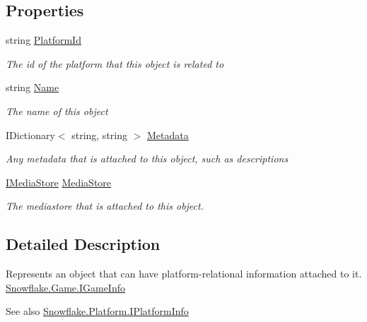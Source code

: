 \subsection*{Properties}
\begin{DoxyCompactItemize}
\item 
string \hyperlink{interface_snowflake_1_1_information_1_1_i_info_adbca5b9f2db24b233866de3304500088}{Platform\+Id}
\begin{DoxyCompactList}\small\item\em The id of the platform that this object is related to \end{DoxyCompactList}\item 
string \hyperlink{interface_snowflake_1_1_information_1_1_i_info_ad9450963e1d3443d2e5df274638fd8be}{Name}
\begin{DoxyCompactList}\small\item\em The name of this object \end{DoxyCompactList}\item 
I\+Dictionary$<$ string, string $>$ \hyperlink{interface_snowflake_1_1_information_1_1_i_info_aeae6832deb9c513619b82c82ab94421c}{Metadata}
\begin{DoxyCompactList}\small\item\em Any metadata that is attached to this object, such as descriptions \end{DoxyCompactList}\item 
\hyperlink{interface_snowflake_1_1_information_1_1_media_store_1_1_i_media_store}{I\+Media\+Store} \hyperlink{interface_snowflake_1_1_information_1_1_i_info_a871b33234ef2b413be1ee8e6846768b6}{Media\+Store}
\begin{DoxyCompactList}\small\item\em The mediastore that is attached to this object. \end{DoxyCompactList}\end{DoxyCompactItemize}


\subsection{Detailed Description}
Represents an object that can have platform-\/relational information attached to it. \hyperlink{interface_snowflake_1_1_game_1_1_i_game_info}{Snowflake.\+Game.\+I\+Game\+Info} \begin{DoxySeeAlso}{See also}
\hyperlink{interface_snowflake_1_1_platform_1_1_i_platform_info}{Snowflake.\+Platform.\+I\+Platform\+Info}


\end{DoxySeeAlso}




